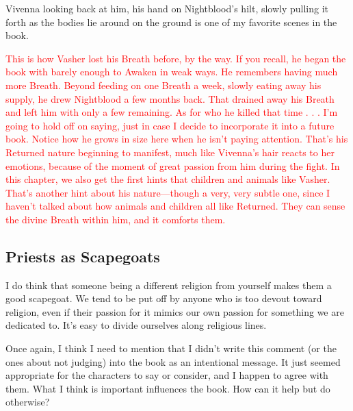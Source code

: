 Vivenna looking back at him, his hand on Nightblood’s hilt, slowly pulling it forth as the bodies lie around on the ground is one of my favorite scenes in the book.

\textcolor{red}{
This is how Vasher lost his Breath before, by the way. If you recall, he began the book with barely enough to Awaken in weak ways. He remembers having much more Breath. Beyond feeding on one Breath a week, slowly eating away his supply, he drew Nightblood a few months back. That drained away his Breath and left him with only a few remaining. As for who he killed that time . . . I’m going to hold off on saying, just in case I decide to incorporate it into a future book.
}
\textcolor{red}{
Notice how he grows in size here when he isn’t paying attention. That’s his Returned nature beginning to manifest, much like Vivenna’s hair reacts to her emotions, because of the moment of great passion from him during the fight.
}
\textcolor{red}{
In this chapter, we also get the first hints that children and animals like Vasher. That’s another hint about his nature—though a very, very subtle one, since I haven’t talked about how animals and children all like Returned. They can sense the divine Breath within him, and it comforts them.
}

\subsection*{Priests as Scapegoats}

I do think that someone being a different religion from yourself makes them a good scapegoat. We tend to be put off by anyone who is too devout toward religion, even if their passion for it mimics our own passion for something we are dedicated to. It’s easy to divide ourselves along religious lines.

Once again, I think I need to mention that I didn’t write this comment (or the ones about not judging) into the book as an intentional message. It just seemed appropriate for the characters to say or consider, and I happen to agree with them. What I think is important influences the book. How can it help but do otherwise?




